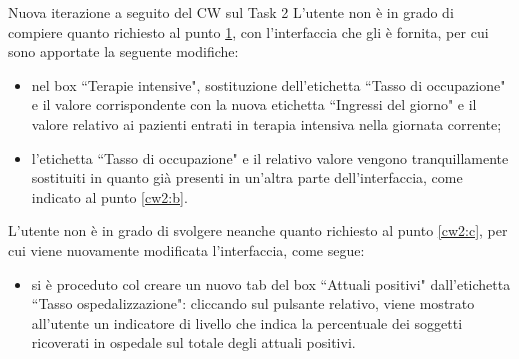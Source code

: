 \begin{bclogo}{Nuova iterazione a seguito del CW sul Task 2}
    L'utente non è in grado di compiere quanto richiesto al punto \hyperref[cw2:a]{1}, con l'interfaccia che gli è fornita, per cui sono apportate la seguente modifiche:
    \begin{itemize}
        \item nel box ``Terapie intensive", sostituzione dell'etichetta ``Tasso di occupazione" e il valore corrispondente con la nuova etichetta ``Ingressi del giorno" e il valore relativo ai pazienti entrati in terapia intensiva nella giornata corrente;
        \item l'etichetta ``Tasso di occupazione" e il relativo valore vengono tranquillamente sostituiti in quanto già presenti in un'altra parte dell'interfaccia, come indicato al punto \ref{cw2:b}.
    \end{itemize}
   L'utente non è in grado di svolgere neanche quanto richiesto  al punto \ref{cw2:c}, per cui viene nuovamente modificata l'interfaccia, come segue:
    \begin{itemize}
        \item si è proceduto col creare un nuovo tab del box ``Attuali positivi" dall'etichetta ``Tasso ospedalizzazione": cliccando sul pulsante relativo, viene mostrato all'utente un indicatore di livello che indica la percentuale dei soggetti ricoverati in ospedale sul totale degli attuali positivi.
    \end{itemize}
\end{bclogo}